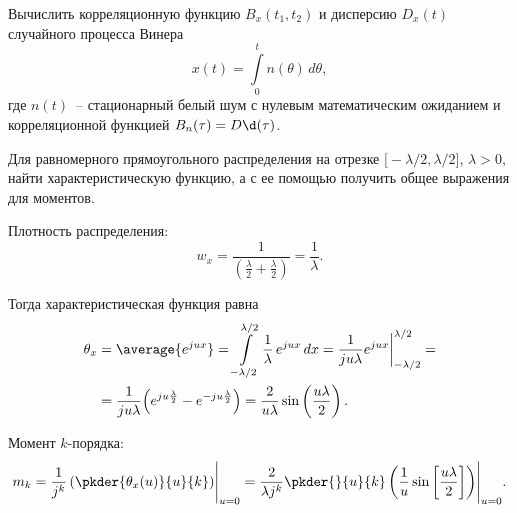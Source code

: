 \documentclass[pscyr]{hedwork}
\begin{document}
  \begin{task}{39}{
    Вычислить корреляционную функцию \( B_x(t_1, t_2) \) и дисперсию
    \( D_x(t) \) случайного процесса Винера
    \[
      x(t) = \int\limits_0^t n(\theta)\,d\theta,
    \]
    где \( n(t) \)~-- стационарный белый шум с нулевым математическим ожиданием
    и корреляционной функцией \( B_n(\tau) = D\d(\tau) \).
  }
  
    
  
  \end{task}
  
  \begin{task*}{49}{
    Для равномерного прямоугольного распределения на отрезке
    \( \bigl[-\lambda / 2, \lambda / 2 \big] \), \( \lambda > 0 \), найти
    характеристическую функцию, а с ее помощью получить общее выражения для
    моментов.
  }
  
    Плотность распределения:
    \[
      w_x = \frac{1}{\left(\frac{\lambda}{2} + \frac{\lambda}{2}\right)} =
        \frac{1}{\lambda}.
    \]
    
    Тогда характеристическая функция равна
    \begin{align*}
      \theta_x & = \average{e^{jux}} = \int\limits_{-\lambda/2}^{\lambda/2}
        \frac{1}{\lambda}\,e^{jux}\,dx = \frac{1}{ju\lambda}
        e^{jux}\bigg|_{-\lambda/2}^{\lambda/2} = \\
      & = \frac{1}{ju\lambda} \Bigl(e^{ju\frac{\lambda}{2}} -
        e^{-ju\frac{\lambda}{2}}\Big) =
        \frac{2}{u\lambda}\sin\left(\frac{u\lambda}{2}\right).
    \end{align*}
    
    Момент \( k \)-порядка:
    \[
      m_k = \frac{1}{j^k} \left(\pkder{\theta_x(u)}{u}{k}\right)\Biggr|_{u=0} =
        \frac{2}{\lambda j^k} \pkder{}{u}{k}\left( \frac{1}{u}
        \sin\left[\frac{u\lambda}{2}\right] \right)\Biggr|_{u=0}.
    \]
  
  \end{task*}
\end{document}
